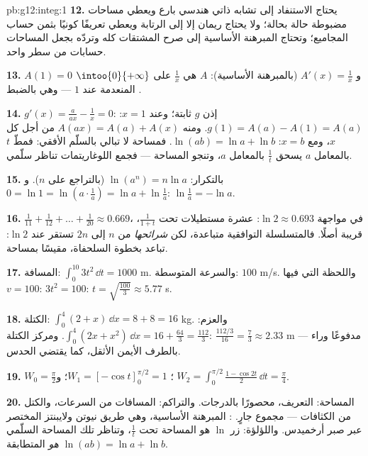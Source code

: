 \begin{solution}{pb:g12:integ:1}
\textbf{12.} يحتاج الاستنفاد إلى تشابه ذاتي هندسي
بارع ويعطي مساحات مضبوطة حالة بحالة؛ ولا يحتاج ريمان
إلا إلى الرتابة ويعطي تعريفًا كونيًا بثمن
حساب المجاميع؛ وتحتاج المبرهنة الأساسية إلى
صرح المشتقات كله وتردّه بجعل المساحات
حسابات من سطر واحد.

\textbf{13.} $A(1) = 0$ و $A'(x) = \frac1x$ (بالمبرهنة
الأساسية):  $A$ هي   $\frac1x$ على
$\intoo{0}{+\infty}$ المنعدمة عند $1$ --- وهي بالضبط
.

\textbf{14.} $g'(x) = \frac{a}{ax} - \frac1x = 0$: إذن $g$
ثابتة؛ وعند $x = 1$: $g(1) = A(a) - A(1) = A(a)$. ومنه
$A(ax) = A(a) + A(x)$ من أجل كل $x$، ومع $x = b$:
$\ln(ab) = \ln a + \ln b$. فمساحة  لا تبالي
بالسلّم الأفقي: فمطّ $t$ بالمعامل $a$ يسحق
$\frac1t$ بالمعامل $a$، وتنجو المساحة --- فجمع
اللوغاريتمات تناظر سلّمي.

\textbf{15.} بالتكرار: $\ln(a^n) = n\ln a$ (بالتراجع على
$n$). و $0 = \ln 1 = \ln\left(a \cdot \frac1a\right) =
\ln a + \ln\frac1a$: $\ln\frac1a = -\ln a$.

\textbf{16.} $\frac{1}{11} + \frac{1}{12} + \dots +
\frac{1}{20} \approx 0.669$، في مواجهة $\ln 2 \approx 0.693$:
عشرة مستطيلات تحت $\frac{1}{1+t}$، قريبة أصلًا. فالمتسلسلة
التوافقية متباعدة، لكن \emph{شرائحها} من $n$ إلى
$2n$ تستقر عند $\ln 2$: تباعد بخطوة السلحفاة، مقيسًا
بمساحة.

\textbf{17.} المسافة: $\int_0^{10} 3t^2\,\dd t = 1000$ m.
والسرعة المتوسطة: $100$ m/s. واللحظة التي فيها $v = 100$:
$3t^2 = 100$: $t = \sqrt{\frac{100}{3}} \approx 5.77$ s.

\textbf{18.} الكتلة: $\int_0^4 (2 + x)\,\dd x = 8 + 8 = 16$ kg.
والعزم: $\int_0^4 (2x + x^2)\,\dd x = 16 + \frac{64}{3} =
\frac{112}{3}$. ومركز الكتلة:
$\frac{112/3}{16} = \frac73 \approx 2.33$ m --- مدفوعًا وراء
 بالطرف الأيمن الأثقل، كما يقتضي الحدس.

\textbf{19.} $W_0 = \frac\pi2$؛ $W_1 = \left[-\cos
t\right]_0^{\pi/2} = 1$؛ و
$W_2 = \int_0^{\pi/2} \frac{1 - \cos 2t}{2}\,\dd t =
\frac\pi4$.

\textbf{20.} المساحة: التعريف، محصورًا بالدرجات.
والتراكم: المسافات من السرعات، والكتل من الكثافات ---
 مجموع جارٍ. :
المبرهنة الأساسية، وهي طريق نيوتن ولايبنتز المختصر عبر
صبر أرخميدس. واللؤلؤة: زر $\ln$ هو المساحة
تحت $\frac1t$، وتناظر تلك المساحة السلّمي \emph{هو}
المتطابقة $\ln(ab) = \ln a + \ln b$.
\end{solution}

